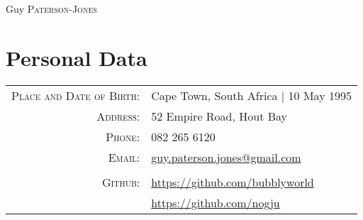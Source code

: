 \documentclass[a4paper,10pt]{article}
\begin{document}
\pagestyle{empty}

\par{
    \centering
	{ \Huge Guy \textsc{Paterson-Jones} }
    \bigskip
    \par
}

\vspace{3em}

\section{Personal Data}
\begin{tabular}{rl}
    \textsc{Place and Date of Birth:} & Cape Town, South Africa  | 10 May 1995 \\
    \textsc{Address:}                 & 52 Empire Road, Hout Bay \\
    \textsc{Phone:}                   & 082 265 6120\\
    \textsc{Email:}                   & \href{mailto:guy.paterson.jones@gmail.com}{guy.paterson.jones@gmail.com} \\ \\
    \textsc{Github:}                  & \href{https://github.com/bubblyworld}{https://github.com/bubblyworld} \\
                                      & \href{https://github.com/nogju}{https://github.com/nogju}
\end{tabular}

\vspace{2em}
\end{document}
